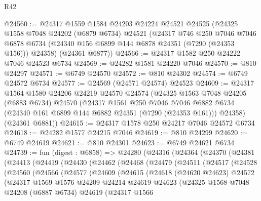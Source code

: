 \begin{lexlean}{R42}
\begin{coremodule}
{@24560 := @24317
    @1559
    @1584
    @24203
    @24224
    @24521
    @24525
    (@24325
      @1558
      @7048
      @24202
      (@6879 @6734)
      @24521
      (@24317
        @746
        @250
        @7046
        @7046
        @6878
        @6734
        (@24340 @156 @6899 @144 @6878 @24351 (@7290 (@24353 @156)))
        @24358)
      (@24361 @6877))
@24566 := @24317 @1582 @250 @24222 @7046 @24523 @6734
@24569 := @24282 @1581 @24220 @7046
@24570 := @810 @24297
@24571 := @6749 @24570
@24572 := @810 @24302
@24574 := @6749 @24572 @6734
@24577 := @24569 (@24571 @24574) @24523
@24609 := @24317
    @1564
    @1580
    @24206
    @24219
    @24570
    @24574
    (@24325
      @1563
      @7048
      @24205
      (@6883 @6734)
      @24570
      (@24317
        @1561
        @250
        @7046
        @7046
        @6882
        @6734
        (@24340 @161 @6899 @144 @6882 @24351 (@7290 (@24353 @161)))
        @24358)
      (@24361 @6881))
@24615 := @24317 @1578 @250 @24217 @7046 @24572 @6734
@24618 := @24282 @1577 @24215 @7046
@24619 := @810 @24299
@24620 := @6749 @24619
@24621 := @810 @24301
@24623 := @6749 @24621 @6734
@24739 := fun (digest : @6858) =>
  @24280
    (@24316
      (@24364
        (@24370
          (@24381
            (@24413
              (@24419
                (@24430
                  (@24462
                    (@24468
                      (@24479
                        (@24511
                          (@24517
                            (@24528
                              (@24560
                                (@24566
                                  (@24577
                                    (@24609
                                      (@24615
                                        (@24618
                                          (@24620 @24623)
                                          @24572
                                          (@24317
                                            @1569
                                            @1576
                                            @24209
                                            @24214
                                            @24619
                                            @24623
                                            (@24325
                                              @1568
                                              @7048
                                              @24208
                                              (@6887 @6734)
                                              @24619
                                              (@24317
                                                @1566
}
\end{coremodule}
\end{lexlean}
